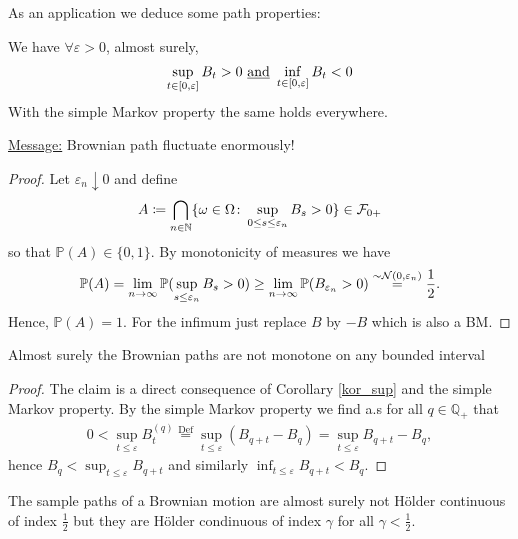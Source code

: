 As an application we deduce some path properties:
\begin{llemma}
\begin{corollary}\label{kor_sup}
	We have $\forall \varepsilon >0$, almost surely,
	\begin{align*}
		\sup_{t\in [0,\varepsilon]} B_t > 0 \text{ \underline{and} } \inf_{t \in [0,\varepsilon]} B_t < 0
	\end{align*}
	With the simple Markov property the same holds everywhere.
\end{corollary}
\end{llemma}
\underline{Message:} Brownian path fluctuate enormously!
\begin{proof}[Proof]
	Let $\varepsilon_n \downarrow 0$ and define 
	\begin{align*}
		A \coloneqq \bigcap_{n\in\mathbb{N}} \{ \omega\in\Omega \colon \sup_{0\leq s \leq \varepsilon_n} B_s > 0\} \in \mathcal{F}_{0+}
	\end{align*}
	so that $\mathbb{P}(A)\in \{0,1\}$. By monotonicity of measures we have
	\begin{align*}
		\mathbb{P}(A) = \lim_{n\to\infty} \mathbb{P}(\sup_{s\leq \varepsilon_n}B_s > 0) \geq \lim_{n\to\infty} \mathbb{P}(B_{\varepsilon_n}>0) \overset{\sim\mathcal{N}(0,\varepsilon_n)}{=} \frac{1}{2}.
	\end{align*}
	Hence, $\mathbb{P}(A)=1$.
	For the infimum just replace $B$ by $-B$ which is also a BM.
\end{proof}
\begin{lsatz}
\begin{theorem}
	Almost surely the Brownian paths are not monotone on any bounded interval
\end{theorem}
\end{lsatz}
\begin{proof}
	The claim is a direct consequence of Corollary \ref{kor_sup} and the simple Markov property. By the simple Markov property we find a.s for all $q\in \mathbb{Q_+}$ that
	\begin{align*}
		0 < \sup_{t\leq \varepsilon} B_t^{(q)} \overset{\text{Def}}{=} \sup_{t\leq \varepsilon} \left(B_{q+t} - B_q \right) = \sup_{t\leq \varepsilon}B_{q+t} - B_q,
	\end{align*}
	hence $B_q < \sup_{t\leq \varepsilon} B_{q+t}$ and similarly $ \inf_{t\leq \varepsilon} B_{q+t}< B_q$.
\end{proof}
\begin{lsatz}
\begin{theorem}
	The sample paths of a Brownian motion are almost surely not H\"older continuous of index $\frac{1}{2}$ but they are H\"older condinuous of index $\gamma$ for all $\gamma<\frac{1}{2}$.
\end{theorem}
\end{lsatz}
	

